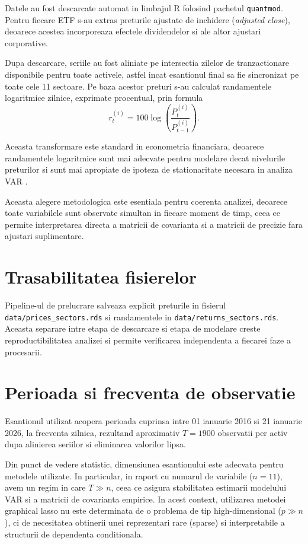 Datele au fost descarcate automat in limbajul R folosind pachetul \texttt{quantmod}.
Pentru fiecare ETF s-au extras preturile ajustate de inchidere (\textit{adjusted close}),
deoarece acestea incorporeaza efectele dividendelor si ale altor ajustari corporative.

Dupa descarcare, seriile au fost aliniate pe intersectia zilelor de tranzactionare
disponibile pentru toate activele, astfel incat esantionul final sa fie sincronizat
pe toate cele 11 sectoare. Pe baza acestor preturi s-au calculat randamentele
logaritmice zilnice, exprimate procentual, prin formula \citep{tsay2010}
\[
r_t^{(i)} = 100 \log\left(\frac{P_t^{(i)}}{P_{t-1}^{(i)}}\right).
\]

Aceasta transformare este standard in econometria financiara, deoarece randamentele
logaritmice sunt mai adecvate pentru modelare decat nivelurile preturilor si sunt
mai apropiate de ipoteza de stationaritate necesara in analiza VAR
\citep{tsay2010}.

Aceasta alegere metodologica este esentiala pentru coerenta analizei, deoarece toate variabilele sunt observate simultan in fiecare moment de timp, ceea ce permite interpretarea directa a matricii de covarianta si a matricii de precizie fara ajustari suplimentare.

\section{Trasabilitatea fisierelor}

Pipeline-ul de prelucrare salveaza explicit preturile in fisierul
\texttt{data/prices\_sectors.rds} si randamentele in
\texttt{data/returns\_sectors.rds}. Aceasta separare intre etapa de descarcare
si etapa de modelare creste reproductibilitatea analizei si permite verificarea
independenta a fiecarei faze a procesarii.

\section{Perioada si frecventa de observatie}

Esantionul utilizat acopera perioada cuprinsa intre 01 ianuarie 2016 si 21 ianuarie 2026, la frecventa zilnica, rezultand aproximativ $T = 1900$ observatii per activ dupa alinierea seriilor si eliminarea valorilor lipsa.

Din punct de vedere statistic, dimensiunea esantionului este adecvata pentru metodele utilizate. In particular, in raport cu numarul de variabile ($n = 11$), avem un regim in care $T \gg n$, ceea ce asigura stabilitatea estimarii modelului VAR si a matricii de covarianta empirice. In acest context, utilizarea metodei graphical lasso nu este determinata de o problema de tip high-dimensional ($p \gg n$), ci de necesitatea obtinerii unei reprezentari rare (sparse) si interpretabile a structurii de dependenta conditionala.

